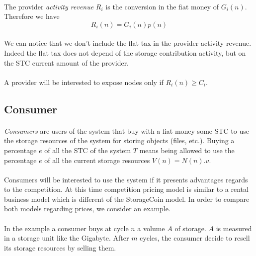 \documentclass[a4paper,12pt]{article}
\begin{document}
\paragraph*{}
The provider \emph{activity revenue} $R_{i}$ is the conversion in the fiat money of $G_{i}(n)$. Therefore we have 
\[R_{i}(n)=G_{i}(n)p(n)\]

\paragraph*{}
We can notice that we don't include the flat tax in the provider activity revenue. Indeed the flat tax does not depend of the storage contribution activity, but on the STC current amount of the provider.

\paragraph*{}
A provider will be interested to expose nodes only if 
$R_{i}(n)\ge{C_{i}}$.

\subsection{Consumer}
\paragraph*{}
\emph{Consumers} are users of the system that buy with a fiat money some STC to use the storage resources of the system for storing objects (files, etc.). 
Buying a percentage $e$ of all the STC of the system $T$ means being allowed to use the percentage $e$ of all the current storage resources $V(n)=N(n).v$.

\paragraph*{}
Consumers will be interested to use the system if it presents advantages regards to the competition.
At this time competition pricing model is similar to a rental business model which is different of the StorageCoin model. 
In order to compare both models regarding prices, we consider an example.

\paragraph*{}
In the example a consumer buys at cycle $n$ a volume $A$ of storage. $A$ is measured in a storage unit like the Gigabyte. After $m$ cycles, the consumer decide to resell its storage resources by selling them.
\end{document}
